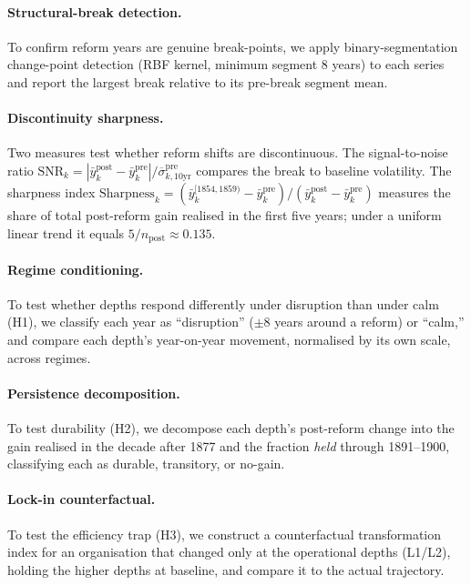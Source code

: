 \documentclass[11pt]{article}
\begin{document}
\paragraph{Structural-break detection.} To confirm reform years are genuine break-points, we
apply binary-segmentation change-point detection (RBF kernel, minimum segment 8 years) to each
series and report the largest break relative to its pre-break segment mean.

\paragraph{Discontinuity sharpness.} Two measures test whether reform shifts are discontinuous.
The signal-to-noise ratio $\text{SNR}_k = |\bar{y}^{\text{post}}_k - \bar{y}^{\text{pre}}_k| /
\overline{\sigma}^{\text{pre}}_{k,10\text{yr}}$ compares the break to baseline volatility. The
sharpness index $\text{Sharpness}_k = (\bar{y}^{[1854,1859)}_k - \bar{y}^{\text{pre}}_k)/
(\bar{y}^{\text{post}}_k - \bar{y}^{\text{pre}}_k)$ measures the share of total post-reform gain
realised in the first five years; under a uniform linear trend it equals $5/n_{\text{post}}
\approx 0.135$.

\paragraph{Regime conditioning.} To test whether depths respond differently under disruption
than under calm (H1), we classify each year as ``disruption'' ($\pm 8$ years around a reform) or
``calm,'' and compare each depth's year-on-year movement, normalised by its own scale, across
regimes.

\paragraph{Persistence decomposition.} To test durability (H2), we decompose each depth's
post-reform change into the gain realised in the decade after 1877 and the fraction \emph{held}
through 1891--1900, classifying each as durable, transitory, or no-gain.

\paragraph{Lock-in counterfactual.} To test the efficiency trap (H3), we construct a
counterfactual transformation index for an organisation that changed only at the operational
depths (L1/L2), holding the higher depths at baseline, and compare it to the actual trajectory.
\end{document}
